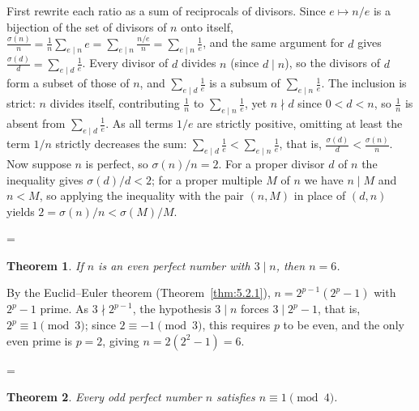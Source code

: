 \documentclass[11pt]{article}
\makeatletter
\theoremstyle{ntstyle}
\newtheorem{theorem}{Theorem}[subsection]
\let\nt@closedisplay\]
\def\nt@guardedclose{\@ifnextchar\par{\nt@closeafterpar}{\@ifnextchar\end{\postdisplaypenalty\@M\nt@closedisplay}{\nt@closedisplay}}}
\def\nt@closeafterpar\par{\@ifnextchar\par{\nt@closeafterpar}{\@ifnextchar\end{\postdisplaypenalty\@M\nt@closedisplay\par}{\nt@closedisplay\par}}}
\renewenvironment{proof}[1][\proofname]{\par
  \pushQED{\qed}\normalfont\topsep\medskipamount\edef\nt@afterproof{\@endparpenalty=\the\@endparpenalty\relax}\@beginparpenalty\@M\@endparpenalty\@M\let\]\nt@guardedclose\trivlist\item[]\textit{#1\@addpunct{.}} \ignorespaces}{\ifvmode\addpenalty\@M\fi\popQED\nt@afterproof\endtrivlist\@endpefalse}
\makeatother
\begin{document}
\begin{proof} First rewrite each ratio as a sum of
	reciprocals of divisors. Since $e\mapsto n/e$ is a bijection of the
	set of divisors of $n$ onto itself,
	$\tfrac{\sigma(n)}{n}=\tfrac{1}{n}\sum_{e\mid n}e=\sum_{e\mid
			n}\tfrac{n/e}{n}=\sum_{e\mid n}\tfrac{1}{e}$, and the same argument
	for $d$ gives $\tfrac{\sigma(d)}{d}=\sum_{e\mid d}\tfrac{1}{e}$.
	Every divisor of $d$ divides $n$ (since $d\mid n$), so
	the divisors of $d$ form a subset of those of $n$, and
	$\sum_{e\mid d}\tfrac{1}{e}$ is a subsum of
	$\sum_{e\mid n}\tfrac{1}{e}$. The inclusion is strict: $n$
	divides itself, contributing $\tfrac{1}{n}$ to $\sum_{e\mid
			n}\tfrac{1}{e}$, yet $n\nmid d$ since $0<d<n$, so $\tfrac{1}{n}$ is absent
	from $\sum_{e\mid d}\tfrac{1}{e}$. As all terms $1/e$ are strictly
	positive, omitting at least the term $1/n$ strictly decreases the
	sum: $\sum_{e\mid d}\tfrac{1}{e}<\sum_{e\mid n}\tfrac{1}{e}$, that is, $\tfrac{\sigma(d)}{d}<\tfrac{\sigma(n)}{n}$. Now suppose $n$ is
	perfect, so $\sigma(n)/n=2$. For a proper divisor $d$ of $n$ the
	inequality gives $\sigma(d)/d<2$; for a proper multiple $M$ of $n$ we
	have $n\mid M$ and $n<M$, so applying the inequality with the pair
	$(n,M)$ in place of $(d,n)$ yields $2=\sigma(n)/n<\sigma(M)/M$.

\end{proof}
\begin{theorem}\label{thm:5.2.3} If $n$ is an even perfect number with $3\mid
		n$, then $n=6$.

\end{theorem}

\begin{proof} By the Euclid--Euler theorem (Theorem~\ref{thm:5.2.1}), $n=2^{p-1}(2^{p}-1)$ with $2^{p}-1$ prime. As $3\nmid
		2^{p-1}$, the hypothesis $3\mid n$ forces $3\mid 2^{p}-1$, that is, $2^{p}\equiv1\pmod{3}$; since $2\equiv-1\pmod{3}$, this requires $p$ to be even,
	and the only even prime is $p=2$, giving $n=2(2^{2}-1)=6$.

\end{proof}
\begin{theorem}\label{thm:5.2.4} Every odd perfect number $n$ satisfies
	$n\equiv1\pmod{4}$.

\end{theorem}
\end{document}
